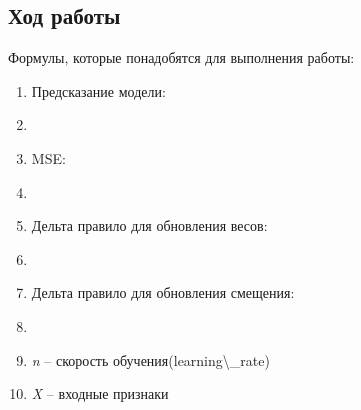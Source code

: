 \documentclass{article}%
\begin{document}
\subsection{ Ход работы}%
\begin{flushleft}%
Формулы, которые понадобятся для выполнения работы:%
%
\end{flushleft}%
\begin{enumerate}%
\item Предсказание модели:%
%
\item %
\item MSE:%
%
\item %
\item Дельта правило для обновления весов:%
%
\item %
\item Дельта правило для обновления смещения:%
%
\item %
\item \textit{n}%
 – скорость обучения(learning\textbackslash{}_rate)%
%
\item \textit{X }%
– входные признаки%


\end{enumerate}
\end{document}
